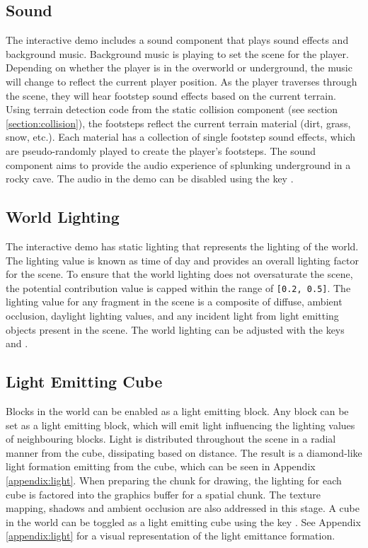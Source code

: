 \documentclass[a4paper,11pt,titlepage]{scrartcl}
\begin{document}
\subsection{Sound}
\label{section:sound}
The interactive demo includes a sound component that plays sound effects and background music.  Background music is playing to set the scene for the player.  Depending on whether the player is in the overworld or underground, the music will change to reflect the current player position.  As the player traverses through the scene, they will hear footstep sound effects based on the current terrain.  Using terrain detection code from the static collision component (see section \ref{section:collision}), the footsteps reflect the current terrain material (dirt, grass, snow, etc.).  Each material has a collection of single footstep sound effects, which are pseudo-randomly played to create the player's footsteps.  The sound component aims to provide the audio experience of splunking underground in a rocky cave.
\vskip 2.5mm\noindent
The audio in the demo can be disabled using the key .
    
\subsection{World Lighting}
\label{section:lighting}
The interactive demo has static lighting that represents the lighting of the world.  The lighting value is known as time of day and provides an overall lighting factor for the scene.  To ensure that the world lighting does not oversaturate the scene, the potential contribution value is capped within the range of \texttt{[0.2, 0.5]}.  The lighting value for any fragment in the scene is a composite of diffuse, ambient occlusion, daylight lighting values, and any incident light from light emitting objects present in the scene.
\vskip 2.5mm\noindent
The world lighting can be adjusted with the keys  and .
    
\subsection{Light Emitting Cube}
\label{section:lights}
Blocks in the world can be enabled as a light emitting block.  Any block can be set as a light emitting block, which will emit light influencing the lighting values of neighbouring blocks.  Light is distributed throughout the scene in a radial manner from the cube, dissipating based on distance.  The result is a diamond-like light formation emitting from the cube, which can be seen in Appendix \ref{appendix:light}.  When preparing the chunk for drawing, the lighting for each cube is factored into the graphics buffer for a spatial chunk.  The texture mapping, shadows and ambient occlusion are also addressed in this stage.  
\vskip 2.5mm\noindent
A cube in the world can be toggled as a light emitting cube using the key .  See Appendix \ref{appendix:light} for a visual representation of the light emittance formation.
    
\end{document}
